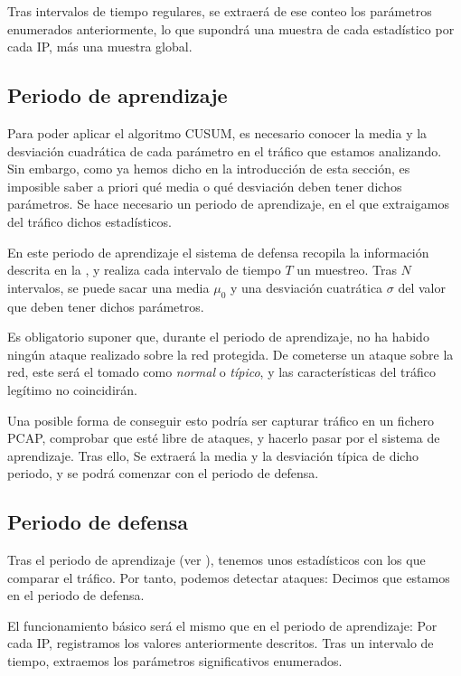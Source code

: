 Tras intervalos de tiempo regulares, se extraerá de ese conteo los parámetros enumerados anteriormente, lo que supondrá 
una muestra de cada estadístico por cada IP, más una muestra global.

\subsection{Periodo de aprendizaje}
Para poder aplicar el algoritmo CUSUM, es necesario conocer la media y la desviación cuadrática de cada parámetro en el 
tráfico que estamos analizando. Sin embargo, como ya hemos dicho en la introducción de esta sección, es imposible saber 
a priori qué media o qué desviación deben tener dichos parámetros. Se hace necesario un periodo de aprendizaje, en el 
que extraigamos del tráfico dichos estadísticos.

En este periodo de aprendizaje el sistema de defensa recopila la información descrita en la 
, y realiza cada intervalo de tiempo $T$ un muestreo. Tras $N$ intervalos, se puede sacar 
una media $\mu_0$ y una desviación cuatrática $\sigma$ del valor que deben tener dichos parámetros.

Es obligatorio suponer que, durante el periodo de aprendizaje, no ha habido ningún ataque realizado sobre la red 
protegida. De cometerse un ataque sobre la red, este será el tomado como \emph{normal} o \emph{típico}, y las 
características del tráfico legítimo no coincidirán.

Una posible forma de conseguir esto podría ser capturar tráfico en un fichero \gls{PCAP}, comprobar que esté libre de 
ataques, y hacerlo pasar por el sistema de aprendizaje. Tras ello, Se extraerá la media y la desviación típica de dicho 
periodo, y se podrá comenzar con el periodo de defensa.

\subsection{Periodo de defensa}
Tras el periodo de aprendizaje (ver ), tenemos unos estadísticos con los que comparar el 
tráfico. Por tanto, podemos detectar ataques: Decimos que estamos en el periodo de defensa.

El funcionamiento básico será el mismo que en el periodo de aprendizaje: Por cada \gls{IP}, registramos los valores 
anteriormente descritos. Tras un intervalo de tiempo, extraemos los parámetros significativos enumerados.

